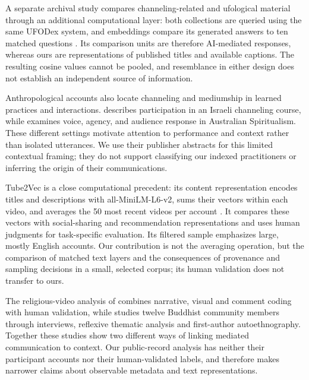 
A separate archival study compares channeling-related and ufological material through an additional computational layer: both collections are queried using the same UFODex system, and embeddings compare its generated answers to ten matched questions \citep{wahbeh2026records}. Its comparison units are therefore AI-mediated responses, whereas ours are representations of published titles and available captions. The resulting cosine values cannot be pooled, and resemblance in either design does not establish an independent source of information.

Anthropological accounts also locate channeling and mediumship in learned practices and interactions. \citet{klinoron2014channel} describes participation in an Israeli channeling course, while \citet{tomlinson2019medium} examines voice, agency, and audience response in Australian Spiritualism. These different settings motivate attention to performance and context rather than isolated utterances. We use their publisher abstracts for this limited contextual framing; they do not support classifying our indexed practitioners or inferring the origin of their communications.

Tube2Vec is a close computational precedent: its content representation encodes titles and descriptions with all-MiniLM-L6-v2, sums their vectors within each video, and averages the 50 most recent videos per account \citep{boesinger2024tube2vec}. It compares these vectors with social-sharing and recommendation representations and uses human judgments for task-specific evaluation. Its filtered sample emphasizes large, mostly English accounts. Our contribution is not the averaging operation, but the comparison of matched text layers and the consequences of provenance and sampling decisions in a small, selected corpus; its human validation does not transfer to ours.

The religious-video analysis of \citet{chen2026digital} combines narrative, visual and comment coding with human validation, while \citet{claisse2023faith} studies twelve Buddhist community members through interviews, reflexive thematic analysis and first-author autoethnography. Together these studies show two different ways of linking mediated communication to context. Our public-record analysis has neither their participant accounts nor their human-validated labels, and therefore makes narrower claims about observable metadata and text representations.
